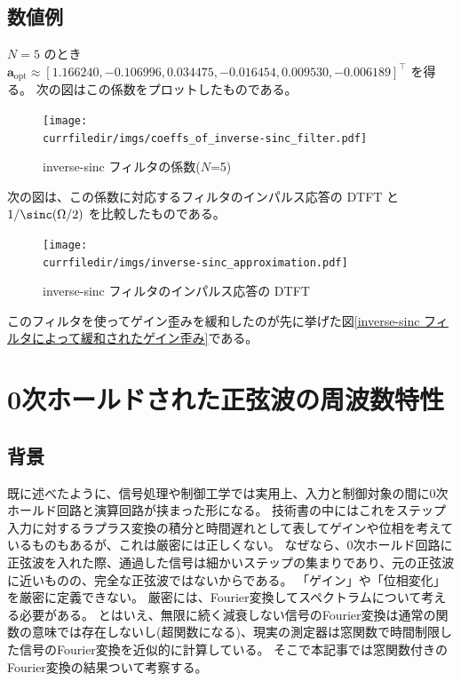         \subsection{数値例}
            $N=5$ のとき $\bm{a}_\text{opt} \approx [1.166240, -0.106996, 0.034475, -0.016454, 0.009530, -0.006189]^\top$ を得る。
            次の図はこの係数をプロットしたものである。
            \begin{figure}[H]
                \centering
                \texttt{[image: \\currfiledir/imgs/coeffs\_of\_inverse-sinc\_filter.pdf]}
                \caption{inverse-sinc フィルタの係数($N$=5)}
            \end{figure}
            次の図は、この係数に対応するフィルタのインパルス応答の DTFT と $1/\sinc(\Omega/2)$ を比較したものである。
            \begin{figure}[H]
                \centering
                \texttt{[image: \\currfiledir/imgs/inverse-sinc\_approximation.pdf]}
                \caption{inverse-sinc フィルタのインパルス応答の DTFT}
            \end{figure}
            このフィルタを使ってゲイン歪みを緩和したのが先に挙げた図\ref{inverse-sinc フィルタによって緩和されたゲイン歪み}である。
    \section{0次ホールドされた正弦波の周波数特性}
        \label{0次ホールドされた正弦波の周波数特性}
        \subsection{背景}
            既に述べたように、信号処理や制御工学では実用上、入力と制御対象の間に0次ホールド回路と演算回路が挟まった形になる。
            技術書の中にはこれをステップ入力に対するラプラス変換の積分と時間遅れとして表してゲインや位相を考えているものもあるが、これは厳密には正しくない。
            なぜなら、0次ホールド回路に正弦波を入れた際、通過した信号は細かいステップの集まりであり、元の正弦波に近いものの、完全な正弦波ではないからである。
            「ゲイン」や「位相変化」を厳密に定義できない。
            厳密には、Fourier変換してスペクトラムについて考える必要がある。
            とはいえ、無限に続く減衰しない信号のFourier変換は通常の関数の意味では存在しないし(超関数になる)、現実の測定器は窓関数で時間制限した信号のFourier変換を近似的に計算している。
            そこで本記事では窓関数付きのFourier変換の結果ついて考察する。
